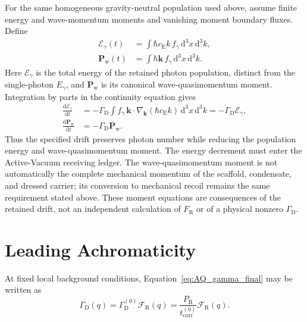 For the same homogeneous gravity-neutral population used above, assume
finite energy and wave-momentum moments and vanishing moment boundary
fluxes. Define
\[
\begin{aligned}
    \mathcal E_{\gamma}(t)
    &=\int\hbar c_{\mathrm E}k\,f_{\gamma}
        \,\mathrm d^3x\,\mathrm d^3k,\\
    \mathbf P_{\mathrm w}(t)
    &=\int\hbar\mathbf k\,f_{\gamma}
        \,\mathrm d^3x\,\mathrm d^3k.
\end{aligned}
\]
Here $\mathcal E_{\gamma}$ is the total energy of the retained photon
population, distinct from the single-photon $E_{\gamma}$, and
$\mathbf P_{\mathrm w}$ is its canonical wave-quasimomentum moment.
Integration by parts in the continuity equation gives
\[
\begin{aligned}
    \frac{\mathrm d\mathcal E_{\gamma}}{\mathrm dt}
    &=-\Gamma_{\mathrm D}
      \int f_{\gamma}\,
      \mathbf k\cdot\nabla_{\mathbf k}(\hbar c_{\mathrm E}k)
      \,\mathrm d^3x\,\mathrm d^3k
      =-\Gamma_{\mathrm D}\mathcal E_{\gamma},\\
    \frac{\mathrm d\mathbf P_{\mathrm w}}{\mathrm dt}
    &=-\Gamma_{\mathrm D}\mathbf P_{\mathrm w}.
\end{aligned}
\]
Thus the specified drift preserves photon number while reducing the
population energy and wave-quasimomentum moment. The energy decrement
must enter the Active-Vacuum receiving ledger. The wave-quasimomentum
moment is not automatically the complete mechanical momentum of the
scaffold, condensate, and dressed carrier; its conversion to mechanical
recoil remains the same requirement stated above. These moment equations
are consequences of the retained drift, not an independent calculation of
$F_{\mathrm R}$ or of a physical nonzero $\Gamma_{\mathrm D}$.

\section{Leading Achromaticity}

At fixed local background conditions,
Equation~\eqref{eq:AQ_gamma_final} may be written as
\begin{equation}
    \boxed{
    \Gamma_{\mathrm D}(q)
    =
    \Gamma_{\mathrm D}^{(0)}
    \mathcal F_{\mathrm R}(q)
    =
    \frac{
        P_{\mathrm R}
    }{
        t_{\mathrm{corr}}^{(0)}
    }
    \mathcal F_{\mathrm R}(q).
    }
    \label{eq:AQ_rate_factorization}
\end{equation}

